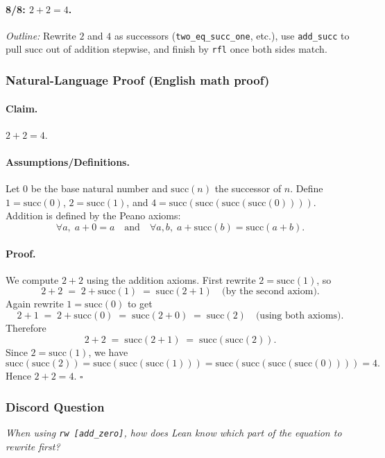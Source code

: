 \documentclass[11pt]{article}
\begin{document}
\paragraph{8/8: $2+2=4$.} \emph{Outline:} Rewrite $2$ and $4$ as successors (\texttt{two\_eq\_succ\_one}, etc.), use \texttt{add\_succ} to pull \(\mathrm{succ}\) out of addition stepwise, and finish by \texttt{rfl} once both sides match.

\subsubsection{Natural-Language Proof (English math proof)}
\paragraph{Claim.} \(2+2=4\).

\paragraph{Assumptions/Definitions.}
Let \(0\) be the base natural number and \(\mathrm{succ}(n)\) the successor of \(n\).
Define \(1=\mathrm{succ}(0)\), \(2=\mathrm{succ}(1)\), and \(4=\mathrm{succ}(\mathrm{succ}(\mathrm{succ}(\mathrm{succ}(0))))\).
Addition is defined by the Peano axioms:
\[
\forall a,\; a+0=a \quad\text{and}\quad \forall a,b,\; a+\mathrm{succ}(b)=\mathrm{succ}(a+b).
\]

\paragraph{Proof.}
We compute \(2+2\) using the addition axioms.
First rewrite \(2=\mathrm{succ}(1)\), so
\[
2+2 \;=\; 2+\mathrm{succ}(1) \;=\; \mathrm{succ}(2+1) \quad\text{(by the second axiom).}
\]
Again rewrite \(1=\mathrm{succ}(0)\) to get
\[
2+1 \;=\; 2+\mathrm{succ}(0) \;=\; \mathrm{succ}(2+0) \;=\; \mathrm{succ}(2) \quad\text{(using both axioms).}
\]
Therefore
\[
2+2 \;=\; \mathrm{succ}(2+1) \;=\; \mathrm{succ}(\mathrm{succ}(2)).
\]
Since \(2=\mathrm{succ}(1)\), we have
\[
\mathrm{succ}(\mathrm{succ}(2))=\mathrm{succ}(\mathrm{succ}(\mathrm{succ}(1)))=
\mathrm{succ}(\mathrm{succ}(\mathrm{succ}(\mathrm{succ}(0))))=4.
\]
Hence \(2+2=4\). \(\square\)

\subsubsection{Discord Question}
\emph{When using \texttt{rw [add\_zero]}, how does Lean know which part of the equation to rewrite first?}
\end{document}
